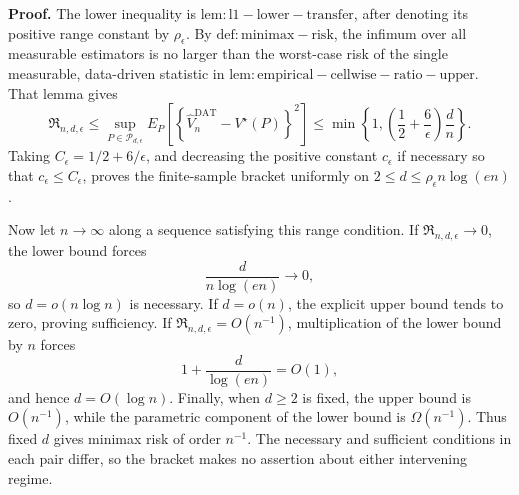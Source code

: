 \textbf{Proof.}
The lower inequality is \(\mathrm{lem:l1-lower-transfer}\), after denoting its positive range constant by \(\rho_\epsilon\).  By \(\mathrm{def:minimax-risk}\), the infimum over all measurable estimators is no larger than the worst-case risk of the single measurable, data-driven statistic in \(\mathrm{lem:empirical-cellwise-ratio-upper}\).  That lemma gives
\[
 \mathfrak R_{n,d,\epsilon}
 \le\sup_{P\in\mathcal P_{d,\epsilon}}
 E_P\!\left[
  \left\{\widehat V_n^{\mathrm{DAT}}-V^\star(P)\right\}^2
 \right]
 \le\min\!\left\{1,
   \left(\frac12+\frac6\epsilon\right)\frac dn
 \right\}.
\]
Taking \(C_\epsilon=1/2+6/\epsilon\), and decreasing the positive constant \(c_\epsilon\) if necessary so that \(c_\epsilon\le C_\epsilon\), proves the finite-sample bracket uniformly on \(2\le d\le\rho_\epsilon n\log(en)\).

Now let \(n\to\infty\) along a sequence satisfying this range condition.  If \(\mathfrak R_{n,d,\epsilon}\to0\), the lower bound forces
\[
 \frac d{n\log(en)}\longrightarrow0,
\]
so \(d=o(n\log n)\) is necessary.  If \(d=o(n)\), the explicit upper bound tends to zero, proving sufficiency.  If \(\mathfrak R_{n,d,\epsilon}=O(n^{-1})\), multiplication of the lower bound by \(n\) forces
\[
 1+\frac d{\log(en)}=O(1),
\]
and hence \(d=O(\log n)\).  Finally, when \(d\ge2\) is fixed, the upper bound is \(O(n^{-1})\), while the parametric component of the lower bound is \(\Omega(n^{-1})\).  Thus fixed \(d\) gives minimax risk of order \(n^{-1}\).  The necessary and sufficient conditions in each pair differ, so the bracket makes no assertion about either intervening regime.
